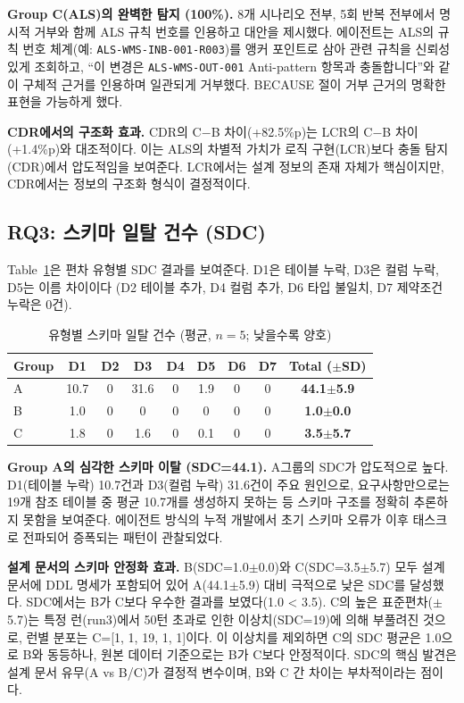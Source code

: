 \documentclass[conference]{IEEEtran}
\begin{document}
\textbf{Group C(ALS)의 완벽한 탐지 (100\%).} 8개 시나리오 전부, 5회 반복 전부에서 명시적 거부와 함께 ALS 규칙 번호를 인용하고 대안을 제시했다. 에이전트는 ALS의 규칙 번호 체계(예: \texttt{ALS-WMS-INB-001-R003})를 앵커 포인트로 삼아 관련 규칙을 신뢰성 있게 조회하고, ``이 변경은 \texttt{ALS-WMS-OUT-001} Anti-pattern 항목과 충돌합니다''와 같이 구체적 근거를 인용하며 일관되게 거부했다. BECAUSE 절이 거부 근거의 명확한 표현을 가능하게 했다.

\textbf{CDR에서의 구조화 효과.} CDR의 C$-$B 차이(+82.5\%p)는 LCR의 C$-$B 차이(+1.4\%p)와 대조적이다. 이는 ALS의 차별적 가치가 로직 구현(LCR)보다 충돌 탐지(CDR)에서 압도적임을 보여준다. LCR에서는 설계 정보의 존재 자체가 핵심이지만, CDR에서는 정보의 구조화 형식이 결정적이다.

\subsection{RQ3: 스키마 일탈 건수 (SDC)}

Table~\ref{tab:sdc-l2}은 편차 유형별 SDC 결과를 보여준다. D1은 테이블 누락, D3은 컬럼 누락, D5는 이름 차이이다 (D2 테이블 추가, D4 컬럼 추가, D6 타입 불일치, D7 제약조건 누락은 0건).

\begin{table}[htbp]
\caption{유형별 스키마 일탈 건수 (평균, $n=5$; 낮을수록 양호)}
\label{tab:sdc-l2}
\centering
\small
\begin{tabular}{@{}lccccccc|c@{}}
\toprule
Group & D1 & D2 & D3 & D4 & D5 & D6 & D7 & Total ($\pm$SD) \\
\midrule
A & 10.7 & 0 & 31.6 & 0 & 1.9 & 0 & 0 & \textbf{44.1$\pm$5.9} \\
B & 1.0 & 0 & 0 & 0 & 0 & 0 & 0 & \textbf{1.0$\pm$0.0} \\
C & 1.8 & 0 & 1.6 & 0 & 0.1 & 0 & 0 & \textbf{3.5$\pm$5.7} \\
\bottomrule
\end{tabular}
\end{table}

\textbf{Group A의 심각한 스키마 이탈 (SDC=44.1).} A그룹의 SDC가 압도적으로 높다. D1(테이블 누락) 10.7건과 D3(컬럼 누락) 31.6건이 주요 원인으로, 요구사항만으로는 19개 참조 테이블 중 평균 10.7개를 생성하지 못하는 등 스키마 구조를 정확히 추론하지 못함을 보여준다. 에이전트 방식의 누적 개발에서 초기 스키마 오류가 이후 태스크로 전파되어 증폭되는 패턴이 관찰되었다.

\textbf{설계 문서의 스키마 안정화 효과.} B(SDC=1.0$\pm$0.0)와 C(SDC=3.5$\pm$5.7) 모두 설계 문서에 DDL 명세가 포함되어 있어 A(44.1$\pm$5.9) 대비 극적으로 낮은 SDC를 달성했다. SDC에서는 B가 C보다 우수한 결과를 보였다(1.0 < 3.5). C의 높은 표준편차($\pm$5.7)는 특정 런(run3)에서 50턴 초과로 인한 이상치(SDC=19)에 의해 부풀려진 것으로, 런별 분포는 C=[1, 1, 19, 1, 1]이다. 이 이상치를 제외하면 C의 SDC 평균은 1.0으로 B와 동등하나, 원본 데이터 기준으로는 B가 C보다 안정적이다. SDC의 핵심 발견은 설계 문서 유무(A vs B/C)가 결정적 변수이며, B와 C 간 차이는 부차적이라는 점이다.
\end{document}
